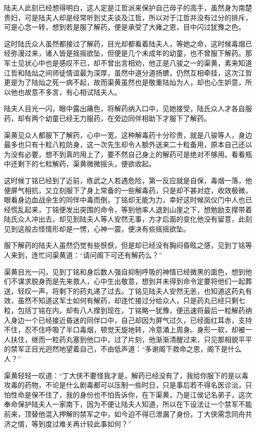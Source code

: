 陆夫人此刻已经想得明白，这人定是江哲派来保护自己母子的高手，虽然身为南楚贵妇，可是陆夫人却是经常听到丈夫谈及江哲，所以对于江哲并没有过分的排斥，可是心念一转，想到若是服了解药，便是承受了大雍之恩，目中闪过犹豫之色。

这时陆氏众人虽然都接过了解药，目光却都看着陆夫人，等她之命，这时候毒烟已经弥漫过来，诸人皆是摇摇欲坠，但便是几个未成年的幼童，也不曾服下解药。那军士见状心中也是感叹不已，却不曾出言相劝，他正是八骏之一的渠黄，素来知道江哲和陆灿之间师徒情谊最为深厚，虽然中道分道扬镳，仍然互相牵挂，这次江哲更是为了陆灿之死一病不起，故而渠黄虽然也是敬重陆灿为人，却也心生妒意，所以他也故意不多言，有心相试陆夫人。

陆夫人目光一闪，眼中露出痛色，将解药纳入口中，见她接受，陆氏众人才各自服药，却有两个幼童已经无力服药，在旁边同伴相助下才服下了解药。

渠黄见众人都服下了解药，心中一宽，这种解毒药十分珍贵，就是八骏等人，身边最多也只有十粒八粒防身，这一次先生却令人额外送来二十粒备用，原本自己还以为没有必要，想不到真的用上了，要不然自己身上的解药可是绝对不够用。看看瓶中还剩下的七粒解药，渠黄微微摇头，便欲收起。

这时候丁铭已经到了近前，练武之人若遇危险，第一反应就是自保，毒烟一落，他便屏气相抗，又立刻服下了身上常备的一些解毒药，只是却不甚对症，收效极微，眼看身边血战余生的同伴中毒而倒，丁铭却无能为力，幸好这时候凤仪门中人也已经慌乱起来，丁铭便发出突围的命令，等到他率人退到山崖之下，想勉励支撑带着陆氏众人冲出去，却见到陆夫人等人安然无事，方才后面的变化他没有留意，此刻见到这般古怪情形却是一愣，心神一震，便决有些摇摇欲坠。

服下解药的陆夫人虽然仍觉有些恹恹，但是却已经没有胸闷昏眩之感，见到丁铭等人来到，连忙问渠黄道：“请问阁下可还有解药么？”

渠黄目光一闪，见到丁铭和身后数人强自抑制呼吸的神情已经微黑的面色，想到他们不谋求脱身而是先来救人，心中生出敬意，想到并未得到命令定要将他们一起葬送，轻叹一声，将剩下的药丸递了过去。丁铭见陆夫人安然无恙，也知道这药丸有效，虽然不知道这军士如何有解药，却连忙接过分给众人，只是药丸已经只剩七粒，包括丁铭在内，却有八人撑到现在，丁铭略一犹豫，便迅速将最后一粒解药纳入身边一个已经接近昏迷的同伴口中，自己却因为屏气过久，已经面红耳赤，支持不住，忍不住呼吸了半口毒烟，顿觉天旋地转，冷意涌上周身。身形一软，却被一人扶住，继而一粒药丸塞到他口中，过了片刻，他渐渐清醒过来，只见那相貌平平的禁军正目光迥然地望着自己，不由低声道：“多谢阁下救命之恩，阁下是什么人？”

渠黄轻轻一叹道：“丁大侠不要怪我才是，解药已经没有了，我给你服下的是以毒攻毒的药物，不论是什么剧毒都可以压制一些时日，只是事后若不得名医诊治，只怕性命是保不住了，我的身份也不怕告诉你，在下渠黄，乃是江侯记名弟子，这次奉命保护陆夫人一家南下，因为不便让陆夫人知道，所以在下设法让一个禁军不能前来，顶替他混入押解的禁军之中，如今迫不得已泄漏了身份，丁大侠需念同舟共济之情，等到度过难关再计较此事如何？”


